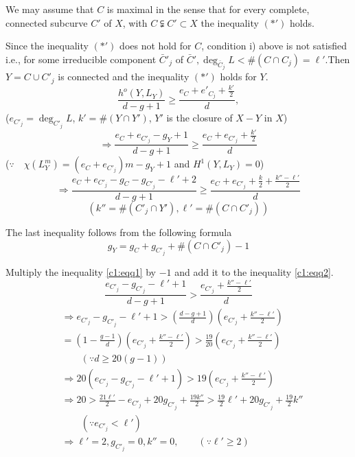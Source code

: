 {\noindent
We may assume that $C$ is maximal in the sense that for every
complete, connected subcurve $C'$ of $X$, with $C \subsetneqq C'
\subset X$ the inequality $(*')$ holds. 

 Since the inequality $(*')$ does not hold for $C$, condition i)
 above is not satisfied i.e., for some irreducible component
 $\bar{C}'_{j}$ of  $\bar{C}', \deg_{\bar{C}_j} L < \# (C\cap C_j) =
 \ell'$.\pageoriginale Then $Y = C \cup C'_j$ is connected and the inequality
$(*')$ holds for $Y$. 
$$
\frac{h^o (Y , L_Y)}{d-g+1} \geq \frac{e_C + e'_{C_j} +
  \frac{k'}{2}}{d}, 
$$
($e_{C'_{j}} = \deg_{C'_j}L$, $k' = \# (Y \cap Y' )$, $Y'$ is the 
  closure of $X - Y$ in $X$)  
$$
 \Rightarrow \frac{e_C + e_{C'_j} - g_Y +1}{d-g+1} \geq \frac{e_C +
  e_{C'_j} + \frac{k'}{2}}{d} 
$$
($\because \quad \chi (L_Y^m) = (e_C + e_{C'_j}) m - g_Y +1$ and 
 $H^1 (Y, L_Y)=0$) 
\begin{equation*}
\Rightarrow \frac{e_C + e_{C'_j} -  g_C - g_{C'_j} - \ell' + 2 }{ d-
  g+1} \geq \frac{e_C + e_{C'_j} + \frac{k}{2} + \frac{k'' -
    \ell'}{2}}{d}\tag{2}\label{c1:eqq2}  
\end{equation*}
$$
(k'' = \# (C'_j \cap Y' ), \ell' = \# (C \cap C'_{j}))
$$

\noindent
The last inequality follows from the following formula
$$
g_Y = g_C + g_{C'_{j}} + \# (C \cap C'_j) -1
$$

\noindent
Multiply the inequality \eqref{c1:eqq1} by $-1$ and add it to the inequality
\eqref{c1:eqq2}. %
\begin{equation*}
\frac{e_{C'_j} - g_{C'_j} - \ell' +1}{ d-g+1} > \frac{e_{C'_j} +
  \frac{k'' - \ell'}{2}}{d} \tag{3}\label{c1:eqq3} 
\end{equation*}
\begin{align*}
& \Rightarrow e_{C'_j} - g_{C'_j}- \ell' +1 > (\frac{d-g+1}{d})
  (e_{C'_j} + \frac{k'' - \ell'}{2})\\ 
& = (1- \frac{g-1}{d}) (e_{C'_j} + \frac{k'' - \ell'}{2}) >
  \frac{19}{20} (e_{C'_j} + \frac{k'' -\ell'}{2})\\ 
&\qquad(\because d \geq 20 (g-1))\\ 
& \Rightarrow 20 (e_{C'_j} - g_{C'_j} - \ell' +1) > 19 (e_{C'_j} +
  \frac{k'' - \ell'}{2})\\ 
& \Rightarrow 20 > \frac{21 \ell'}{2} - e_{C'_j}+ 20 g_{C'_j} +
  \frac{19k''}{2} > \frac{19}{2} \ell'  + 20 g_{C'_j} + \frac{19}{2}k''\\
&\qquad(\because e_{C'_j}< \ell ')\\ 
& \Rightarrow \ell' = 2 , g_{C'_j}=0 , k'' =0, \qquad (\because \ell '
  \geq 2) 
\end{align*}\pageoriginale

}
